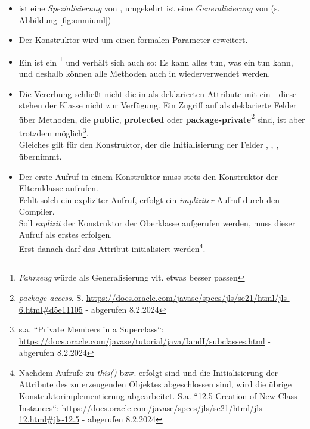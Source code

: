 \begin{itemize}
    \item {} ist eine \textit{Spezialisierung} von , umgekehrt ist
     eine \textit{Generalisierung} von  (s. Abbildung \ref{fig:onmiuml})
    \item Der Konstruktor wird um einen formalen Parameter  erweitert.
    \item Ein  ist ein \footnote{\textit{Fahrzeug} würde als Generalisierung vlt. etwas besser passen} und verhält sich auch so: Es kann alles tun, was ein  tun kann, und deshalb können alle Methoden auch in  wiederverwendet werden.
    \item Die Vererbung schließt nicht die in  als  deklarierten Attribute mit ein - diese stehen der Klasse  nicht zur Verfügung.
    Ein Zugriff auf als  deklarierte Felder über Methoden, die \textbf{public}, \textbf{protected} oder \textbf{package-private}\footnote{\textit{package access}. S. \url{https://docs.oracle.com/javase/specs/jls/se21/html/jls-6.html#d5e11105} - abgerufen 8.2.2024} sind, ist aber trotzdem möglich\footnote{s.a. ``Private Members in a Superclass``: \url{https://docs.oracle.com/javase/tutorial/java/IandI/subclasses.html} - abgerufen 8.2.2024}.\\
    Gleiches gilt für den Konstruktor, der die Initialisierung der Felder , , ,  übernimmt.
    \item Der erste Aufruf in einem Konstruktor muss stets den Konstruktor der Elternklasse aufrufen.\\
    Fehlt solch ein expliziter Aufruf, erfolgt ein \textit{impliziter} Aufruf durch den Compiler.\\
    Soll \textit{explizit} der Konstruktor der Oberklasse aufgerufen werden, muss dieser Aufruf als erstes erfolgen.\\
    Erst danach darf das Attribut  initialisiert werden\footnote{
    Nachdem Aufrufe zu \textit{this()} bzw.  erfolgt sind und die Initialisierung der Attribute des zu erzeugenden Objektes abgeschlossen sind, wird die übrige Konstruktorimplementierung abgearbeitet. S.a. ``12.5 Creation of New Class Instances``: \url{https://docs.oracle.com/javase/specs/jls/se21/html/jls-12.html#jls-12.5} - abgerufen 8.2.2024
    }.
\end{itemize}
